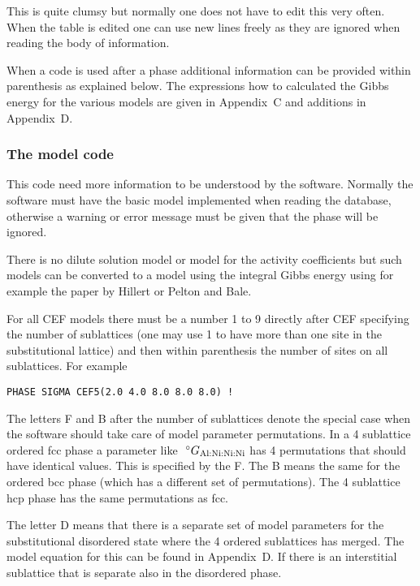 \documentclass[12pt]{article}
\begin{document}
This is quite clumsy but normally one does not have to edit this
very often.  When the table is edited one can use new lines freely as
they are ignored when reading the body of information.

When a code is used after a phase additional information
can be provided within parenthesis as explained below.  The
expressions how to calculated the Gibbs energy for the various models
are given in Appendix~C and additions in Appendix~D.

\subsubsection{The model code}\label{sec:modcode}

This code need more information to be understood by the software.
Normally the software must have the basic model implemented when
reading the database, otherwise a warning or error message must be
given that the phase will be ignored.

There is no dilute solution model or model for the activity
coefficients but such models can be converted to a model using the
integral Gibbs energy using for example the paper by
Hillert\cite{86Hil} or Pelton and Bale\cite{86Pel}.

For all CEF models there must be a number 1 to 9 directly after CEF
specifying the number of sublattices (one may use 1 to have more than
one site in the substitutional lattice) and then within parenthesis
the number of sites on all sublattices.  For example

\begin{verbatim}
PHASE SIGMA CEF5(2.0 4.0 8.0 8.0 8.0) !
\end{verbatim}

The letters F and B after the number of sublattices denote the special
case when the software should take care of model parameter
permutations.  In a 4 sublattice ordered fcc phase a parameter like
$~^{\circ}G_{\rm Al:Ni:Ni:Ni}$ has 4 permutations that should have
identical values.  This is specified by the F.  The B means the same
for the ordered bcc phase (which has a different set of permutations).
The 4 sublattice hcp phase has the same permutations as fcc.

The letter D means that there is a separate set of model parameters
for the substitutional disordered state where the 4 ordered sublattices
has merged.  The model equation for this can be found in Appendix~D.
If there is an interstitial sublattice that is separate also in the
disordered phase.
\end{document}
